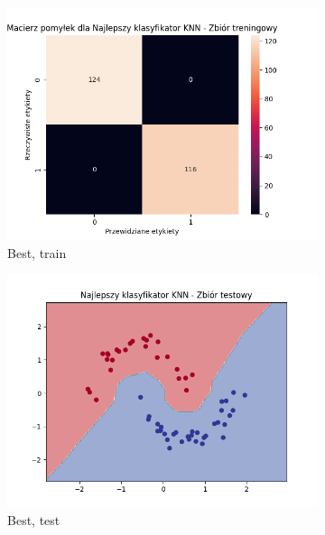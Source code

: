 \documentclass[12pt]{article}
\newcommand*{\subfigwidth}{0.15\textwidth}
\begin{document}
\begin{figure}[H]
\begin{subfigure}[t]{\subfigwidth}
        \includegraphics[width=\linewidth]{img/exp_2/knn/2_2/best/train_matrix.png}
        \caption{Best, train}
    \end{subfigure}
    \hfill
    \begin{subfigure}[t]{\subfigwidth}
        \includegraphics[width=\linewidth]{img/exp_2/knn/2_2/best/test_boundary.png}
        \caption{Best, test}
    \end{subfigure}
    \hfill
    \begin{subfigure}[t]{\subfigwidth}

\end{subfigure}
\end{figure}
\end{document}
